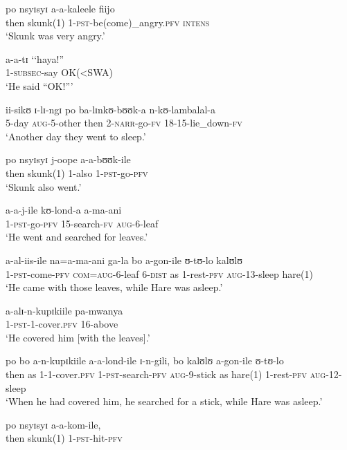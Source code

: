 \begin{exe}
\ex\gll po nsyɪsyɪ a-a-kaleele fiijo\\
then skunk(1) 1-\textsc{pst}-be(come)\_angry.\textsc{pfv} \textsc{intens}\\
\glt `Skunk was very angry.'

\ex\gll a-a-tɪ \lq\lq haya!''\\
1-\textsc{subsec}-say \phantom{\lq\lq}OK(<SWA)\\
\glt `He said ``OK!''{}'

\ex \gll ii-sikʊ ɪ-lɪ-ngɪ po ba-lɪnkʊ-bʊʊk-a n-kʊ-lambalal-a\\
5-day \textsc{aug}-5-other then 2-\textsc{narr}-go-\textsc{fv} 18-15-lie\_down-\textsc{fv}\\
\glt \lq  ‎‎Another day they went to sleep.'

\ex \gll po nsyɪsyɪ j-oope a-a-bʊʊk-ile\\
then skunk(1) 1-also 1-\textsc{pst}-go-\textsc{pfv}\\
\glt \lq Skunk also went.'

\ex \gll a-a-j-ile kʊ-lond-a a-ma-ani\\
1-\textsc{pst}-go-\textsc{pfv} 15-search-\textsc{fv} \textsc{aug}-6-leaf\\
\glt \lq He went and searched for leaves.'

\ex \gll a-al-iis-ile na=a-ma-ani ga-la bo a-gon-ile ʊ-tʊ-lo kalʊlʊ\\
1-\textsc{pst}-come-\textsc{pfv} \textsc{com}=\textsc{aug}-6-leaf 6-\textsc{dist} as 1-rest-\textsc{pfv} \textsc{aug}-13-sleep hare(1)\\
\glt \lq He came with those leaves, while Hare was asleep.'

\ex \gll a-alɪ-n-kupɪkiile pa-mwanya\\
1-\textsc{pst}-1-cover.\textsc{pfv} 16-above\\
\glt \lq He covered him [with the leaves].'

\ex \gll po bo a-n-kupɪkiile a-a-lond-ile ɪ-n-gili, bo kalʊlʊ a-gon-ile ʊ-tʊ-lo\\
then as 1-1-cover.\textsc{pfv} 1-\textsc{pst}-search-\textsc{pfv} \textsc{aug}-9-stick as hare(1) 1-rest-\textsc{pfv} \textsc{aug}-12-sleep\\
\glt \lq When he had covered him, he searched for a stick, while Hare was asleep.'

\ex \gll po nsyɪsyɪ a-a-kom-ile,\\
then skunk(1) 1-\textsc{pst}-hit-\textsc{pfv}\\


\end{exe}
